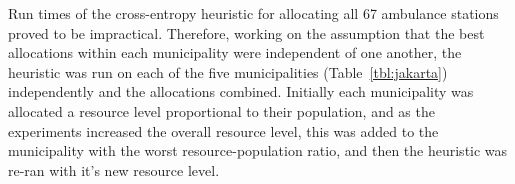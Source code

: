 \documentclass[preprint,12pt]{elsarticle}
\begin{document}
Run times of the cross-entropy heuristic for allocating all 67 ambulance stations proved to be impractical. Therefore, working on the assumption that the best allocations within each municipality were independent of one another, the heuristic was run on each of the five municipalities (Table~\ref{tbl:jakarta}) independently and the allocations combined. Initially each municipality was allocated a resource level proportional to their population, and as the experiments increased the overall resource level, this was added to the municipality with the worst resource-population ratio, and then the heuristic was re-ran with it's new resource level.


\end{document}

